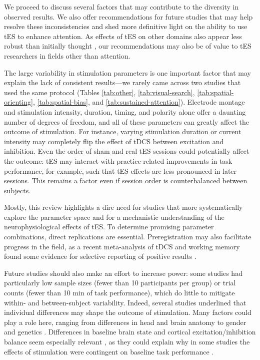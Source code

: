 \documentclass[11pt,english,]{memoir}
\begin{document}
We proceed to discuss several factors that may contribute to the diversity in observed results. We also offer recommendations for future studies that may help resolve these inconsistencies and shed more definitive light on the ability to use tES to enhance attention. As effects of tES on other domains also appear less robust than initially thought \autocites[e.g.,][]{Horvath2015}{Lopez-Alonso2014}{Lopez-Alonso2015}{Mancuso2016}, our recommendations may also be of value to tES researchers in fields other than attention.

The large variability in stimulation parameters is one important factor that may explain the lack of consistent results---we rarely came across two studies that used the same protocol (Tables \ref{tab:other}, \ref{tab:visual-search}, \ref{tab:spatial-orienting}, \ref{tab:spatial-bias}, and \ref{tab:sustained-attention}). Electrode montage and stimulation intensity, duration, timing, and polarity alone offer a daunting number of degrees of freedom, and all of these parameters can greatly affect the outcome of stimulation. For instance, varying stimulation duration \autocite{Monte-Silva2013} or current intensity \autocite{Batsikadze2013} may completely flip the effect of tDCS between excitation and inhibition. Even the order of sham and real tES sessions could potentially affect the outcome: tES may interact with practice-related improvements in task performance, for example, such that tES effects are less pronounced in later sessions. This remains a factor even if session order is counterbalanced between subjects.

Mostly, this review highlights a dire need for studies that more systematically explore the parameter space and for a mechanistic understanding of the neurophysiological effects of tES. To determine promising parameter combinations, direct replications are essential. Preregistration may also facilitate progress in the field, as a recent meta-analysis of tDCS and working memory found some evidence for selective reporting of positive results \autocite{Mancuso2016}.

Future studies should also make an effort to increase power: some studies had particularly low sample sizes (fewer than 10 participants per group) or trial counts (fewer than 10 min of task performance), which do little to mitigate within- and between-subject variability. Indeed, several studies underlined that individual differences may shape the outcome of stimulation. Many factors could play a role here, ranging from differences in head and brain anatomy to gender and genetics \autocites[for reviews, see][]{Krause2014}{Li2015b}. Differences in baseline brain state and cortical excitation/inhibition balance seem especially relevant \autocite{Krause2013}, as they could explain why in some studies the effects of stimulation were contingent on baseline task performance \autocites[e.g.,][]{Benwell2015}{Learmonth2015}{London2015}.
\end{document}
